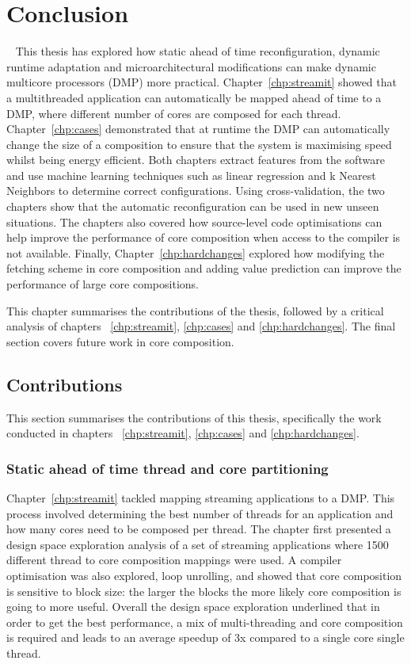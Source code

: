 \chapter{Conclusion}~\label{chp:conclusion}
This thesis has explored how static ahead of time reconfiguration, dynamic runtime adaptation and microarchitectural modifications can make dynamic multicore processors (DMP) more practical.
Chapter~\ref{chp:streamit} showed that a multithreaded application can automatically be mapped ahead of time to a DMP, where different number of cores are composed for each thread.
Chapter~\ref{chp:cases} demonstrated that at runtime the DMP can automatically change the size of a composition to ensure that the system is maximising speed whilst being energy efficient.
Both chapters extract features from the software and use machine learning techniques such as linear regression and k Nearest Neighbors to determine correct configurations.
Using cross-validation, the two chapters show that the automatic reconfiguration can be used in new unseen situations.
The chapters also covered how source-level code optimisations can help improve the performance of core composition when access to the compiler is not available.
Finally, Chapter~\ref{chp:hardchanges} explored how modifying the fetching scheme in core composition and adding value prediction can improve the performance of large core compositions.

This chapter summarises the contributions of the thesis, followed by a critical analysis of chapters ~\ref{chp:streamit}, \ref{chp:cases} and \ref{chp:hardchanges}.
The final section covers future work in core composition.

\section{Contributions}
This section summarises the contributions of this thesis, specifically the work conducted in chapters  ~\ref{chp:streamit}, \ref{chp:cases} and \ref{chp:hardchanges}.
\subsection{Static ahead of time thread and core partitioning}

Chapter~\ref{chp:streamit} tackled mapping streaming applications to a DMP.
This process involved determining the best number of threads for an application and how many cores need to be composed per thread.
The chapter first presented a design space exploration analysis of a set of streaming applications where 1500 different thread to core composition mappings were used.
A compiler optimisation was also explored, loop unrolling, and showed that core composition is sensitive to block size: the larger the blocks the more likely core composition is going to more useful.
Overall the design space exploration underlined that in order to get the best performance, a mix of multi-threading and core composition is required and leads to an average speedup of 3x compared to a single core single thread.
 
